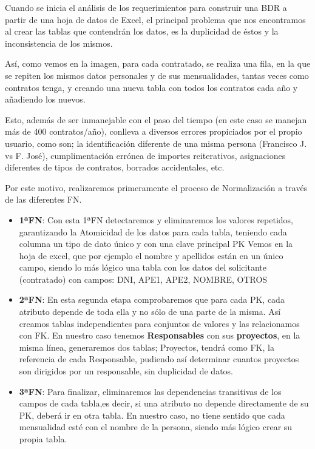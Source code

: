 Cuando se inicia el análisis de los requerimientos para construir una \acrshort{BDR} a partir de una hoja de datos de Excel, el principal problema que nos encontramos al crear las tablas que contendrán los datos, es la duplicidad de éstos y la inconsistencia de los mismos. ~\cite{AbrahamSilberschatzFundamentosBasesDatos2006} 
\label{img: contrato}

Así, como vemos en la imagen, para cada contratado, se realiza una fila, en la que se repiten los mismos datos personales y de sus mensualidades, tantas veces como contratos tenga, y creando una nueva tabla con todos los contratos cada año y añadiendo los nuevos.

Esto, además de ser inmanejable con el paso del tiempo (en este caso se manejan más de 400 contratos/año), conlleva a diversos errores propiciados por el propio usuario, como son; la identificación diferente de una misma persona (Francisco J. vs F. José), cumplimentación errónea de importes reiterativos, asignaciones diferentes de tipos de contratos, borrados accidentales, etc.

Por este motivo, realizaremos primeramente el proceso de \gls{Normalización} a través de las diferentes \acrfull{FN}.
\begin{itemize}
	\item \textbf{1ª\acrshort{FN}}: Con esta 1ª\acrshort{FN} detectaremos y eliminaremos los valores repetidos, garantizando la \gls{Atomicidad} de los datos para cada tabla, teniendo cada columna un tipo de dato único y con una clave principal \acrshort{PK}
	Vemos en la hoja de excel, que por ejemplo el nombre y apellidos están en un único campo, siendo lo más lógico una tabla con los datos del solicitante (contratado) con campos: DNI, APE1, APE2, NOMBRE, OTROS
	\item \textbf{2ª\acrshort{FN}}:	En esta segunda etapa comprobaremos que para cada \acrshort{PK}, cada atributo depende de toda ella y no sólo de una parte de la misma. Así creamos tablas independientes para conjuntos de valores y las relacionamos con \acrfull{FK}.
	En nuestro caso tenemos \textbf{Responsables} con sus \textbf{proyectos}, en la misma línea, generaremos dos tablas; Proyectos, tendrá como \acrshort{FK}, la referencia de cada Responsable, pudiendo así determinar cuantos proyectos son dirigidos por un responsable, sin duplicidad de datos.
	\item \textbf{3ª\acrshort{FN}}: Para finalizar, eliminaremos las dependencias transitivas de los campos de cada tabla,es decir, si una atributo no depende directamente de su \acrshort{PK}, deberá ir en otra tabla. En nuestro caso, no tiene sentido que cada mensualidad esté con el nombre de la persona, siendo más lógico crear su propia tabla.
\end{itemize}

